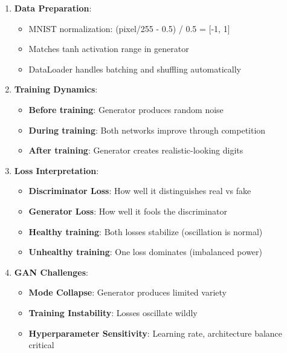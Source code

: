 \documentclass[11pt]{article}
\providecommand{\tightlist}{%
      \setlength{\itemsep}{0pt}\setlength{\parskip}{0pt}}
\begin{document}
\begin{enumerate}
\def\labelenumi{\arabic{enumi}.}
\tightlist
\item
  \textbf{Data Preparation}:

  \begin{itemize}
  \tightlist
  \item
    MNIST normalization: (pixel/255 - 0.5) / 0.5 = {[}-1, 1{]}
  \item
    Matches tanh activation range in generator
  \item
    DataLoader handles batching and shuffling automatically
  \end{itemize}
\item
  \textbf{Training Dynamics}:

  \begin{itemize}
  \tightlist
  \item
    \textbf{Before training}: Generator produces random noise
  \item
    \textbf{During training}: Both networks improve through competition
  \item
    \textbf{After training}: Generator creates realistic-looking digits
  \end{itemize}
\item
  \textbf{Loss Interpretation}:

  \begin{itemize}
  \tightlist
  \item
    \textbf{Discriminator Loss}: How well it distinguishes real vs fake
  \item
    \textbf{Generator Loss}: How well it fools the discriminator
  \item
    \textbf{Healthy training}: Both losses stabilize (oscillation is
    normal)
  \item
    \textbf{Unhealthy training}: One loss dominates (imbalanced power)
  \end{itemize}
\item
  \textbf{GAN Challenges}:

  \begin{itemize}
  \tightlist
  \item
    \textbf{Mode Collapse}: Generator produces limited variety
  \item
    \textbf{Training Instability}: Losses oscillate wildly
  \item
    \textbf{Hyperparameter Sensitivity}: Learning rate, architecture
    balance critical
  \end{itemize}
\end{enumerate}
\end{document}
